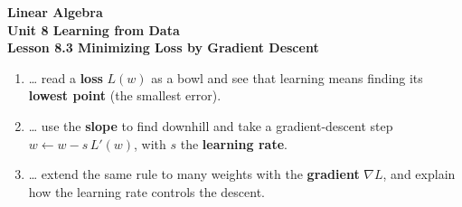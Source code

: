 \documentclass[10pt]{article}
\begin{document}
\vspace{-0.8in}

\begin{center}
  {\color{white}\textbf{\LARGE Linear Algebra}}\\[4pt]
  {\color{blushmid}\large\textbf{Unit 8 \quad Learning from Data}}\\[6pt]
  {\color{white}\textbf{\large Lesson 8.3 \quad Minimizing Loss by Gradient Descent}}
\end{center}

\vspace{0.22in}
\namedateperiod
\vspace{0.18in}

\begin{learningtargetbox}
\small
\begin{enumerate}[leftmargin=1.5em, itemsep=5pt]
  \item \ldots{} read a \textbf{loss} $L(w)$ as a bowl and see that learning means finding its \textbf{lowest point} (the smallest error).
  \item \ldots{} use the \textbf{slope} to find downhill and take a gradient-descent step $w\leftarrow w-s\,L'(w)$, with $s$ the \textbf{learning rate}.
  \item \ldots{} extend the same rule to many weights with the \textbf{gradient} $\nabla L$, and explain how the learning rate controls the descent.
\end{enumerate}
\end{learningtargetbox}

\vspace{0.14in}
\end{document}
